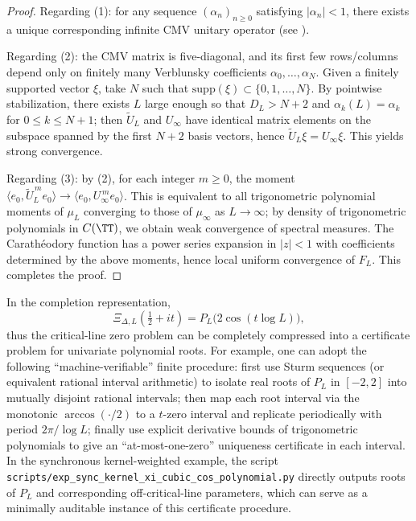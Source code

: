\begin{proof}
Regarding (1): for any sequence \((\alpha_n)_{n\ge 0}\) satisfying \(|\alpha_n|<1\), there exists a unique corresponding infinite CMV unitary operator (see \cite{Simon2005OPUC1}).

Regarding (2): the CMV matrix is five-diagonal, and its first few rows/columns depend only on finitely many Verblunsky coefficients \(\alpha_0,\dots,\alpha_{N}\).
Given a finitely supported vector \(\xi\), take \(N\) such that \(\mathrm{supp}(\xi)\subset\{0,1,\dots,N\}\). By pointwise stabilization, there exists \(L\) large enough so that \(D_L>N+2\) and \(\alpha_k(L)=\alpha_k\) for \(0\le k\le N+1\); then \(\widetilde U_L\) and \(U_\infty\) have identical matrix elements on the subspace spanned by the first \(N+2\) basis vectors, hence \(\widetilde U_L\xi=U_\infty\xi\). This yields strong convergence.

Regarding (3): by (2), for each integer \(m\ge 0\), the moment \(\langle e_0,\widetilde U_L^{\,m}e_0\rangle\to \langle e_0,U_\infty^{\,m}e_0\rangle\).
This is equivalent to all trigonometric polynomial moments of \(\mu_L\) converging to those of \(\mu_\infty\) as \(L\to\infty\); by density of trigonometric polynomials in \(C(\TT)\), we obtain weak convergence of spectral measures.
The Carath\'eodory function has a power series expansion in \(|z|<1\) with coefficients determined by the above moments, hence local uniform convergence of \(F_L\). This completes the proof.
\end{proof}

\begin{remark}\label{rem:xi-hard-zero-certificate}
In the completion representation,
\[
\Xi_{\Delta,L}\!\left(\tfrac12+it\right)=P_L\!\bigl(2\cos(t\log L)\bigr),
\]
thus the critical-line zero problem can be completely compressed into a certificate problem for univariate polynomial roots.
For example, one can adopt the following ``machine-verifiable'' finite procedure: first use Sturm sequences (or equivalent rational interval arithmetic) to isolate real roots of \(P_L\) in \([-2,2]\) into mutually disjoint rational intervals; then map each root interval via the monotonic \(\arccos(\cdot/2)\) to a \(t\)-zero interval and replicate periodically with period \(2\pi/\log L\); finally use explicit derivative bounds of trigonometric polynomials to give an ``at-most-one-zero'' uniqueness certificate in each interval.
In the synchronous kernel-weighted example, the script \texttt{scripts/exp\_sync\_kernel\_xi\_cubic\_cos\_polynomial.py} directly outputs roots of \(P_L\) and corresponding off-critical-line parameters, which can serve as a minimally auditable instance of this certificate procedure.
\end{remark}

